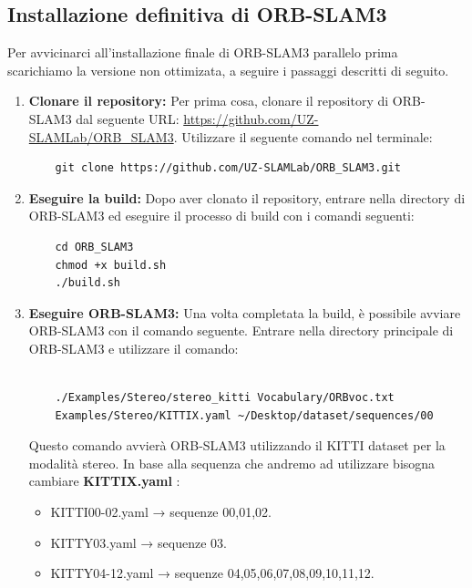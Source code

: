 \documentclass[12pt,a4paper]{report}
\begin{document}
\subsection{Installazione definitiva di ORB-SLAM3}

Per avvicinarci all'installazione finale di ORB-SLAM3 parallelo prima scarichiamo la versione non ottimizata, a seguire i passaggi descritti di seguito.

\begin{enumerate}
    \item \textbf{Clonare il repository:} Per prima cosa, clonare il repository di ORB-SLAM3 dal seguente URL: \url{https://github.com/UZ-SLAMLab/ORB_SLAM3}. Utilizzare il seguente comando nel terminale:

    \begin{verbatim}
    git clone https://github.com/UZ-SLAMLab/ORB_SLAM3.git
    \end{verbatim}

    \item \textbf{Eseguire la build:} Dopo aver clonato il repository, entrare nella directory di ORB-SLAM3 ed eseguire il processo di build con i comandi seguenti:

    \begin{verbatim}
    cd ORB_SLAM3
    chmod +x build.sh
    ./build.sh
    \end{verbatim}

    \item \textbf{Eseguire ORB-SLAM3:} Una volta completata la build, è possibile avviare ORB-SLAM3 con il comando seguente. Entrare nella directory principale di ORB-SLAM3 e utilizzare il comando:

    \noindent
    \begin{verbatim}
    
    ./Examples/Stereo/stereo_kitti Vocabulary/ORBvoc.txt 
    Examples/Stereo/KITTIX.yaml ~/Desktop/dataset/sequences/00
    \end{verbatim}

    Questo comando avvierà ORB-SLAM3 utilizzando il KITTI dataset per la modalità stereo.
    In base alla sequenza che andremo ad utilizzare bisogna cambiare \textbf{KITTIX.yaml} : 
    \begin{itemize}
        \item  KITTI00-02.yaml → sequenze 00,01,02.
        \item KITTY03.yaml → sequenze 03.
        \item KITTY04-12.yaml → sequenze 04,05,06,07,08,09,10,11,12.
    \end{itemize}
\end{enumerate}
\end{document}
